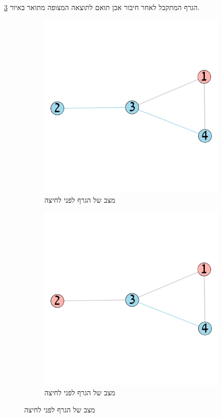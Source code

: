 \documentclass[12pt,leqno]{article}
\theoremstyle{theoremdd}
\begin{document}
הגרף המתקבל לאחר חיבור אכן תואם לתוצאה המצופה
מתואר באיור 
\ref{fig:start graph presses solution}.

\begin{figure}[ht]
    \caption{
        דוגמה לתיאור וקטור שינוי במהלך משחק על גרף
        }
    \label{fig: change vector on graph}
    \centering
    \begin{subfigure}[b]{.4\linewidth}
        \caption{מצב של הגרף לפני לחיצה}
        \label{fig:start graph presses}
        \centering
        \includegraphics[width=.7\textwidth,keepaspectratio]{images/graph_presses.png}
    \end{subfigure}
    \begin{subfigure}[b]{.4\linewidth}
        \caption{מצב של הגרף לפני לחיצה}
        \label{fig:start graph presses solution}
        \centering
        \includegraphics[width=.7\textwidth,keepaspectratio]{images/graph_presses_solve.png}
    \end{subfigure}
\end{figure}
\end{document}
